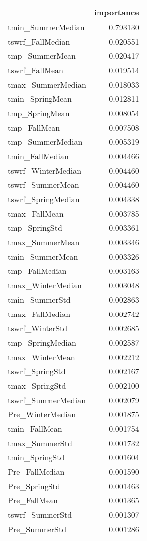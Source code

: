 \begin{tabular}{lr}
\toprule
 & importance \\
\midrule
tmin_SummerMedian & 0.793130 \\
tswrf_FallMedian & 0.020551 \\
tmp_SummerMean & 0.020417 \\
tswrf_FallMean & 0.019514 \\
tmax_SummerMedian & 0.018033 \\
tmin_SpringMean & 0.012811 \\
tmp_SpringMean & 0.008054 \\
tmp_FallMean & 0.007508 \\
tmp_SummerMedian & 0.005319 \\
tmin_FallMedian & 0.004466 \\
tswrf_WinterMedian & 0.004460 \\
tswrf_SummerMean & 0.004460 \\
tswrf_SpringMedian & 0.004338 \\
tmax_FallMean & 0.003785 \\
tmp_SpringStd & 0.003361 \\
tmax_SummerMean & 0.003346 \\
tmin_SummerMean & 0.003326 \\
tmp_FallMedian & 0.003163 \\
tmax_WinterMedian & 0.003048 \\
tmin_SummerStd & 0.002863 \\
tmax_FallMedian & 0.002742 \\
tswrf_WinterStd & 0.002685 \\
tmp_SpringMedian & 0.002587 \\
tmax_WinterMean & 0.002212 \\
tswrf_SpringStd & 0.002167 \\
tmax_SpringStd & 0.002100 \\
tswrf_SummerMedian & 0.002079 \\
Pre_WinterMedian & 0.001875 \\
tmin_FallMean & 0.001754 \\
tmax_SummerStd & 0.001732 \\
tmin_SpringStd & 0.001604 \\
Pre_FallMedian & 0.001590 \\
Pre_SpringStd & 0.001463 \\
Pre_FallMean & 0.001365 \\
tswrf_SummerStd & 0.001307 \\
Pre_SummerStd & 0.001286 \\

\end{tabular}
